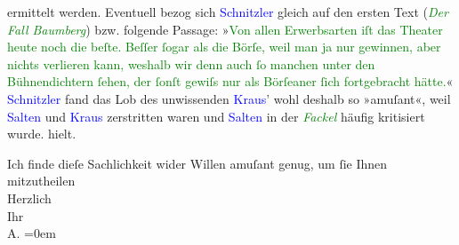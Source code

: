 {{{                  ermittelt werden. Eventuell bezog sich \textcolor{blue}{Schnitzler} gleich auf den ersten Text (\emph{\textcolor{green}{Der Fall Baumberg}}) bzw. folgende Passage: »\textcolor{green}{Von allen Erwerbsarten iſt
                        das Theater heute noch die beſte. Beſſer ſogar als die Börſe, weil man ja
                        nur gewinnen, aber nichts verlieren kann, weshalb wir denn auch ſo manchen
                        unter den Bühnendichtern ſehen, der ſonſt gewiſs nur als Börſeaner ſich
                        fortgebracht hätte.}« \textcolor{blue}{Schnitzler} fand das Lob des
                  unwissenden \textcolor{blue}{Kraus}’ wohl deshalb so
                     »amuſant«, weil \textcolor{blue}{Salten} und
                     \textcolor{blue}{Kraus} zerstritten waren und \textcolor{blue}{Salten} in der \emph{\textcolor{green}{Fackel}} häufig kritisiert wurde.}}}\label{K_L02975-2h}{ }{\pb}hielt.\pend
           
\pstart
           Ich finde dieſe Sachlichkeit wider Willen amuſant genug, um ſie Ihnen
               mitzutheilen {\\[\baselineskip]}Herzlich {\\[\baselineskip]}Ihr {\\[\baselineskip]}\spacefill\mbox{A.}\pend
           \leftskip=0em{}\endnumbering{}  
      